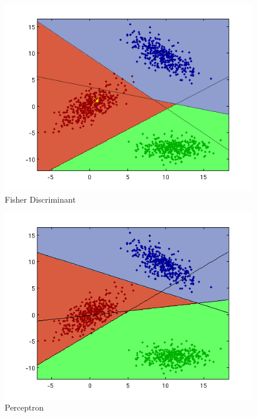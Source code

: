 \documentclass[a4paper]{article}
\begin{document}
\begin{figure}[htbp!]
\center
\includegraphics[clip, trim=40px 15px 30px 10px]{ls_fisher.png}
\caption{Fisher Discriminant}
\end{figure}

\begin{figure}[htbp!]
\center
\includegraphics[clip, trim=40px 15px 30px 10px]{perceptron.png}
\caption{Perceptron}
\end{figure}
\end{document}
